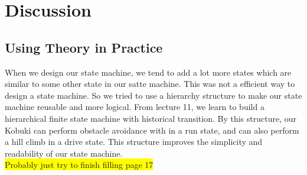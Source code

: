 \section{Discussion}
\subsection{Using Theory in Practice}
When we design our state machine, we tend to add a lot more states which are similar to some other state in our satte machine. This was not a efficient way to design a state machine. So we tried to use a hierarchy structure to make our state machine reusable and more logical. From lecture 11, we learn to build a hierarchical finite state machine with historical transition. By this structure, our Kobuki can perform obstacle avoidance with in a run state, and can also perform a hill climb in a drive state. This structure improves the simplicity and readability of our state machine. %
\\
\colorbox{yellow}{Probably just try to finish filling page 17}

\clearpage

